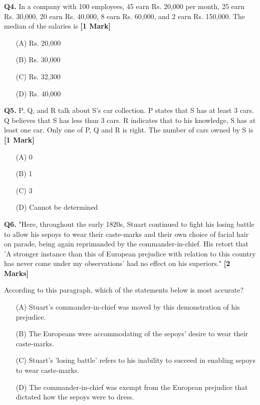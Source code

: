 \documentclass[11pt]{article}
\newcommand{\questiona}[2]{
    \noindent\textbf{Q#2.} #1 \hfill \textbf{[1 Mark]}
}
\newcommand{\questionb}[2]{
    \noindent\textbf{Q#2.} #1 \hfill \textbf{[2 Marks]}
}
\begin{document}
\questiona{In a company with 100 employees, 45 earn Rs. 20,000 per month, 25 earn Rs. 30,000, 20 earn Rs. 40,000, 8 earn Rs. 60,000, and 2 earn Rs. 150,000. The median of the salaries is}{4}
\begin{enumerate}
    \item[(A)] Rs. 20,000  
    \item[(B)] Rs. 30,000  
    \item[(C)] Rs. 32,300  
    \item[(D)] Rs. 40,000  
\end{enumerate}
\vspace{0.5cm}

\questiona{P, Q, and R talk about S's car collection. P states that S has at least 3 cars. Q believes that S has less than 3 cars. R indicates that to his knowledge, S has at least one car. Only one of P, Q and R is right. The number of cars owned by S is}{5}
\begin{enumerate}
    \item[(A)] 0  
    \item[(B)] 1  
    \item[(C)] 3  
    \item[(D)] Cannot be determined  
\end{enumerate}
\vspace{0.5cm}

\questionb{"Here, throughout the early 1820s, Stuart continued to fight his losing battle to allow his sepoys to wear their caste-marks and their own choice of facial hair on parade, being again reprimanded by the commander-in-chief. His retort that 'A stronger instance than this of European prejudice with relation to this country has never come under my observations' had no effect on his superiors."}{6}

According to this paragraph, which of the statements below is most accurate?
\begin{enumerate}
    \item[(A)] Stuart's commander-in-chief was moved by this demonstration of his prejudice.  
    \item[(B)] The Europeans were accommodating of the sepoys' desire to wear their caste-marks.  
    \item[(C)] Stuart's 'losing battle' refers to his inability to succeed in enabling sepoys to wear caste-marks.  
    \item[(D)] The commander-in-chief was exempt from the European prejudice that dictated how the sepoys were to dress.  
\end{enumerate}
\vspace{0.5cm}
\end{document}
